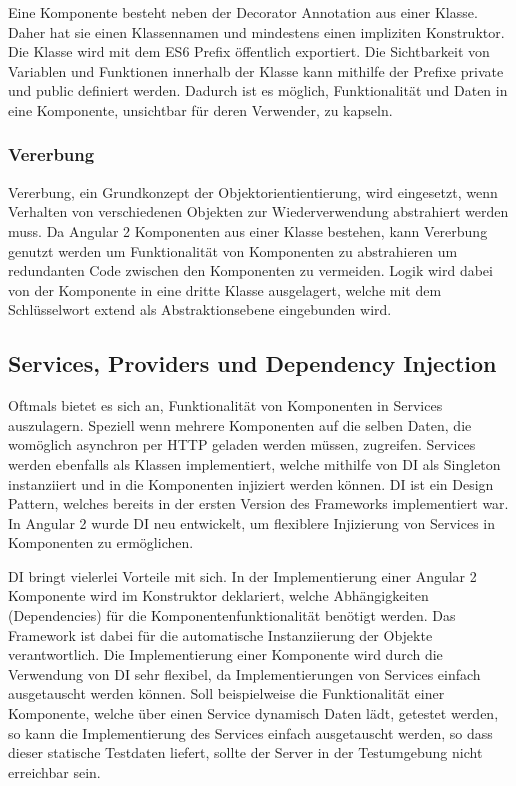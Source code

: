 Eine Komponente besteht neben der Decorator Annotation aus einer Klasse.
Daher hat sie einen Klassennamen und mindestens einen impliziten Konstruktor.
Die Klasse wird mit dem ES6 Prefix öffentlich exportiert. Die Sichtbarkeit von Variablen und Funktionen
innerhalb der Klasse kann mithilfe der Prefixe private und public definiert werden.
Dadurch ist es möglich, Funktionalität und Daten in eine Komponente, unsichtbar für deren Verwender, zu kapseln.

\vspace{1cm}

\vspace{1cm}


\subsubsection{Vererbung}

Vererbung, ein Grundkonzept der Objektorientientierung,
wird eingesetzt, wenn Verhalten von verschiedenen Objekten zur Wiederverwendung
abstrahiert werden muss. Da Angular 2 Komponenten aus einer Klasse bestehen,
kann Vererbung genutzt werden um Funktionalität von Komponenten zu abstrahieren
um redundanten Code zwischen den Komponenten
zu vermeiden. Logik wird dabei von der Komponente in eine dritte Klasse ausgelagert,
welche mit dem Schlüsselwort extend als
Abstraktionsebene eingebunden wird. \cite{DanWa45:online}


\subsection{Services, Providers und Dependency Injection}

Oftmals bietet es sich an, Funktionalität von Komponenten in Services auszulagern.
Speziell wenn mehrere Komponenten auf die selben Daten,
die womöglich asynchron per HTTP geladen werden müssen, zugreifen.
Services werden ebenfalls als Klassen implementiert, welche mithilfe von \ac{DI}
als Singleton instanziiert und in die Komponenten injiziert werden können.
\ac{DI} ist ein Design Pattern, welches bereits in der ersten Version des Frameworks implementiert war.
In Angular 2 wurde \ac{DI} neu entwickelt, um flexiblere Injizierung von Services in Komponenten zu ermöglichen.

\ac{DI} bringt vielerlei Vorteile mit sich. In der Implementierung einer Angular 2 Komponente wird im
Konstruktor deklariert, welche Abhängigkeiten (Dependencies) für die Komponentenfunktionalität benötigt werden.
Das Framework ist dabei für die automatische Instanziierung der Objekte verantwortlich.
Die Implementierung einer Komponente wird durch die Verwendung von \ac{DI} sehr flexibel,
da Implementierungen von Services einfach ausgetauscht werden können.
Soll beispielweise die Funktionalität einer Komponente, welche über einen Service dynamisch Daten lädt, getestet werden,
so kann die Implementierung des Services einfach ausgetauscht werden, so dass dieser statische Testdaten liefert,
sollte der Server in der Testumgebung nicht erreichbar sein.
\cite[281]{Angular2}


